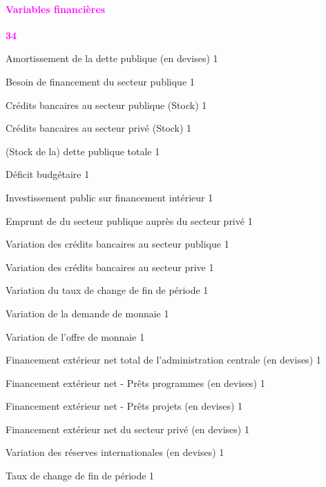 \documentclass[11pt,a4paper]{article}
\newcommand{\DEFG}{\mathit{DEFG}}
\newcommand{\BRG}{\mathit{BRG}}
\newcommand{\DINVG}{\mathit{DINVG}}
\newcommand{\redparagraph}[1]{\paragraph*{\large\textcolor{Fuchsia}{#1}}}
\newcommand{\NFDG}{\mathit{NFDG}}
\newcommand{\DCG}{\mathit{DCG}}
\newcommand{\BG}{\mathit{BG}}
\newcommand{\AMORTG}{\mathit{AMORTG}}
\newcommand{\RES}{\mathit{RES}}
\newcommand{\NFDP}{\mathit{NFDP}}
\newcommand{\MS}{\mathit{MS}}
\newcommand{\MD}{\mathit{MD}}
\newcommand{\DCP}{\mathit{DCP}}
\newcommand{\ER}{\mathit{ER}}
\newcommand{\DEBTG}{\mathit{DEBTG}}
\begin{document}
	\redparagraph{Variables financières}\hfill \textcolor{Fuchsia}{\textbf{34}} 
	\begin{description}[leftmargin=!,labelwidth=\widthof{\bfseries AAAAAAAA},parsep=10pt]
		\item[$\AMORTG$]          Amortissement de la dette publique (en devises)	\hfill 1
		\item[$\BRG$]             Besoin de financement du secteur publique	\hfill 1
		\item[$\DCG$]             Crédits bancaires au secteur publique (Stock)	\hfill 1
		\item[$\DCP$]             Crédits bancaires au secteur privé (Stock)	\hfill 1
		\item[$\DEBTG$]           (Stock de la) dette publique totale	\hfill 1
		\item[$\DEFG$]            Déficit budgétaire	\hfill 1
		\item[$\DINVG$]           Investissement public sur financement intérieur	\hfill 1
		\item[$\Delta\BG$]            Emprunt de du secteur publique auprès du secteur privé	\hfill 1
		\item[$\Delta\DCG$]           Variation des crédits bancaires au secteur publique	\hfill 1
		\item[$\Delta\DCP$]          Variation des crédits bancaires au secteur prive	\hfill 1
		\item[$\Delta\ER$]            Variation du taux de change de fin de période	\hfill 1
		\item[$\Delta\MD$]      Variation de la demande de monnaie	\hfill 1
		\item[$\Delta\MS$]            Variation de l'offre de monnaie	\hfill 1
		\item[$\Delta\NFDG$]          Financement extérieur net total de l'administration centrale (en devises)	\hfill 1
		\item[$\Delta\NFDG^{\mathit{prg}}$]      Financement extérieur net - Prêts programmes (en devises)	\hfill 1
		\item[$\Delta\NFDG^{\mathit{prj}}$]      Financement extérieur net - Prêts projets (en devises)	\hfill 1
		\item[$\Delta\NFDP$]          Financement extérieur net du secteur privé  (en devises)	\hfill 1
		\item[$\Delta\RES$]           Variation des réserves internationales (en devises)	\hfill 1
		\item[$\ER$]              Taux de change de fin de période	\hfill 1

\end{description}
\end{document}

